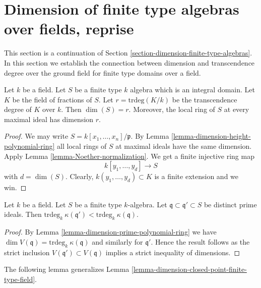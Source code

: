 \section{Dimension of finite type algebras over fields, reprise}
\label{section-dimension-finite-type-algebras-reprise}

\noindent
This section is a continuation of
Section \ref{section-dimension-finite-type-algebras}.
In this section we establish the connection between dimension and
transcendence degree over the ground field for finite type domains
over a field.

\begin{lemma}
\label{lemma-dimension-prime-polynomial-ring}
Let $k$ be a field.
Let $S$ be a finite type $k$ algebra which is an integral domain.
Let $K$ be the field of fractions of $S$.
Let $r = \text{trdeg}(K/k)$ be the transcendence degree of $K$ over $k$.
Then $\dim(S) = r$. Moreover, the local ring of $S$ at every maximal
ideal has dimension $r$.
\end{lemma}

\begin{proof}
We may write $S = k[x_1, \ldots, x_n]/\mathfrak p$.
By Lemma \ref{lemma-dimension-height-polynomial-ring}
all local rings of $S$ at maximal ideals have the same dimension.
Apply Lemma \ref{lemma-Noether-normalization}.
We get a finite injective ring map
$$
k[y_1, \ldots, y_d] \to S
$$
with $d = \dim(S)$. Clearly, $k(y_1, \ldots, y_d) \subset K$
is a finite extension and we win.
\end{proof}

\begin{lemma}
\label{lemma-tr-deg-specialization}
Let $k$ be a field. Let $S$ be a finite type $k$-algebra.
Let $\mathfrak q \subset \mathfrak q' \subset S$ be distinct
prime ideals. Then
$\text{trdeg}_k\ \kappa(\mathfrak q') < \text{trdeg}_k\ \kappa(\mathfrak q)$.
\end{lemma}

\begin{proof}
By
Lemma \ref{lemma-dimension-prime-polynomial-ring}
we have $\dim V(\mathfrak q) = \text{trdeg}_k\ \kappa(\mathfrak q)$
and similarly for $\mathfrak q'$. Hence the result follows
as the strict inclusion $V(\mathfrak q') \subset V(\mathfrak q)$
implies a strict inequality of dimensions.
\end{proof}

\noindent
The following lemma generalizes
Lemma \ref{lemma-dimension-closed-point-finite-type-field}.

